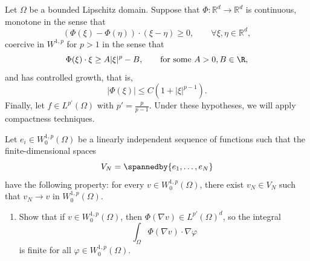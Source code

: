 \begin{example}
    Let $\Omega$ be a bounded Lipschitz domain. Suppose that $\Phi : {\mathbb R^d} \to {\mathbb R^d}$ is continuous,
    monotone in the sense that
    \begin{equation*}
        (\Phi(\xi) - \Phi(\eta) ) \cdot (\xi - \eta) \ge 0, \qquad \forall \xi, \eta \in {\mathbb R^d},
    \end{equation*}
    coercive in $W^{1,p}$ for $p > 1$ in the sense that
    \begin{equation*}
        \Phi(\xi) \cdot \xi \ge A |\xi|^p - B , \qquad \text{for some }A > 0, B \in \R ,
    \end{equation*}
    and has controlled growth, that is,
    \begin{equation}
        \label{eq:quasilinear crecimiento a}
        |\Phi(\xi)| \le C(1+|\xi|^{p-1}).
    \end{equation}
    Finally, let $f \in L^{p'}(\Omega)$ with $p'= \frac{p}{p-1}$.
    Under these hypotheses, we will apply compactness techniques.

    Let $e_i \in W^{1,p}_0 (\Omega)$ be a linearly independent sequence of functions such that the finite-dimensional spaces
    \begin{equation*}
        V_N = \spannedby\{e_1, \dots, e_N\}
    \end{equation*}
    have the following property: for every $v \in W^{1,p}_0(\Omega)$, there exist $v_N \in V_N$ such that $v_N \to v$ in $W^{1,p}_0(\Omega)$.
    \begin{enumerate}
        \item Show that if $v \in W_0^{1,p}(\Omega)$, then $\Phi(\nabla v) \in L^{p'}(\Omega)^d$, so the integral
              $$
                  \int_\Omega \Phi(\nabla v) \cdot \nabla \varphi
              $$
              is finite for all $\varphi \in W_0^{1,p} (\Omega)$.


\end{enumerate}
\end{example}
